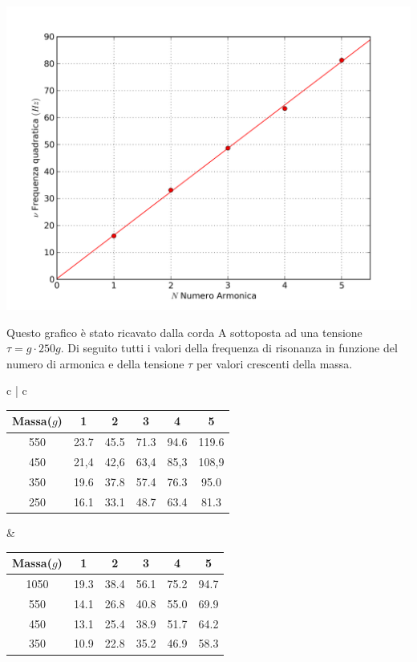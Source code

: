 \begin{center}

\includegraphics[scale=0.5]{../grafici/corda_1armonica}
\end{center}
Questo grafico è stato ricavato dalla corda A sottoposta ad una tensione $\tau=g\cdot250g$. Di seguito tutti i valori della frequenza di risonanza in funzione del numero di armonica e della tensione $\tau$ per valori crescenti della massa.
\begin{center}
\begin{tabular}{c   |  c}
\begin{tabular}{ c | c | c | c | c | c }
Massa($g$) & 1 & 2 & 3 & 4 & 5\\
\midrule
550 & 23.7 & 45.5 & 71.3 & 94.6 & 119.6\\
450 & 21,4 & 42,6 & 63,4 & 85,3 & 108,9\\
350 & 19.6 & 37.8 & 57.4 & 76.3 & 95.0\\
250 & 16.1 & 33.1 & 48.7 & 63.4 & 81.3 \\
\end{tabular}
&
\begin{tabular}{ c | c | c | c | c | c }
Massa($g$) & 1 & 2 & 3 & 4 & 5\\
\midrule
1050 & 19.3 & 38.4 & 56.1 & 75.2 & 94.7 \\
550 & 14.1 & 26.8 & 40.8 & 55.0 & 69.9 \\
450 & 13.1 & 25.4 & 38.9 & 51.7 & 64.2\\
350 & 10.9 & 22.8 & 35.2 & 46.9 & 58.3\\
\end{tabular}
\\
\end{tabular}
\end{center}

